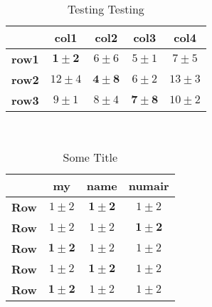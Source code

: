 \documentclass{article}
\begin{document}
\begin{center}



\begin{table}[ht]
\centering
\begin{tabular}
{ |c|c|c|c|c| }
\hline
&\textbf{col1}&\textbf{col2}&\textbf{col3}&\textbf{col4}\\ [0.1ex]
\hline 
\textbf{row1}& $\mathbf{1 \pm 2}$ & $6 \pm 6$ & $5 \pm 1$ & $7 \pm 5$ \\ \hline
\textbf{row2}& $12 \pm 4$ & $\mathbf{4 \pm 8}$ & $6 \pm 2$ & $13 \pm 3$ \\ \hline
\textbf{row3}& $9 \pm 1$ & $8 \pm 4$ & $\mathbf{7 \pm 8}$ & $10 \pm 2$ \\ \hline
\end{tabular}
\\[-1.5ex]
\caption{Testing Testing}
\end{table}




















\end{center}

\begin{table}[ht]
\centering
\begin{tabular}{|c|c|c|c|}

\hline
&\textbf{my} & \textbf{name} & \textbf{numair}
\\ [0.1ex]
 
\hline
\textbf{Row} & $1 \pm 2$ & $\mathbf{1 \pm 2}$ & $1 \pm 2$ \\ 
\hline
\textbf{Row} & $1 \pm 2$ & $1 \pm 2$ & $\mathbf{1 \pm 2}$ \\
\hline
\textbf{Row} & $\mathbf{1 \pm 2}$ & $1 \pm 2$ & $1 \pm 2$ \\
\hline
\textbf{Row} & $1 \pm 2$ & $\mathbf{1 \pm 2}$ & $1 \pm 2$ \\
\hline
\textbf{Row} & $\mathbf{1 \pm 2}$ & $1 \pm 2$ & $1 \pm 2$ \\
\hline %
\end{tabular}
\label{table:nonlin} %
\\[-1.5ex]
\caption{Some Title}
\end{table}
		
\end{document}
